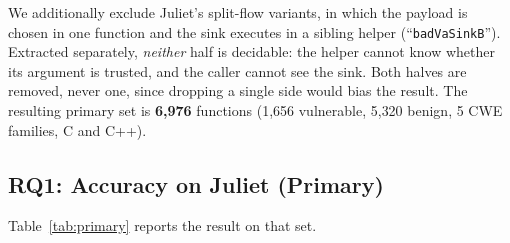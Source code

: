 \documentclass[10pt,conference]{IEEEtran}
\begin{document}
\begin{table}[t]
\centering
\caption{Evaluation scope. The out-of-scope classes are not failures of the
implementation but questions a flow-sensitive intraprocedural analysis cannot
answer; they are reported separately in Sec.~\ref{sec:outofscope}.}
\label{tab:scope}
\footnotesize
{}
\end{table}

We additionally exclude Juliet's split-flow variants, in which the payload is
chosen in one function and the sink executes in a sibling helper
(``\texttt{badVaSinkB}''). Extracted separately, \emph{neither} half is
decidable: the helper cannot know whether its argument is trusted, and the
caller cannot see the sink. Both halves are removed, never one, since
dropping a single side would bias the result. The resulting primary set is
\textbf{6{,}976} functions (1{,}656 vulnerable, 5{,}320 benign, 5 CWE
families, C and C++).

\subsection{RQ1: Accuracy on Juliet (Primary)}
Table~\ref{tab:primary} reports the result on that set.
\end{document}
